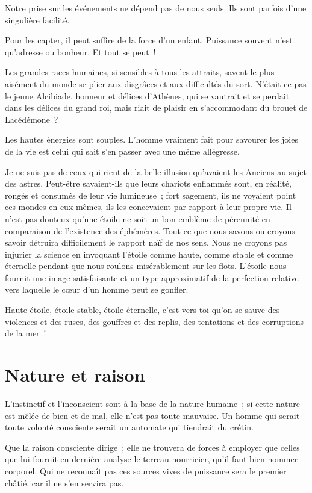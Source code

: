 \documentclass[french,twoside]{book} %
\newcommand{\astermono}{\medskip\centerline{\color{rubric}\large\selectfont{\syms ✻}}\medskip\par}%
\begin{document}
\astermono

\noindent Notre prise sur les événements ne dépend pas de nous seuls. Ils sont parfois d’une singulière facilité.\par
Pour les capter, il peut suffire de la force d’un enfant. Puissance souvent n’est qu’adresse ou bonheur. Et tout se peut !\par

\astermono

\noindent Les grandes races humaines, si sensibles à tous les attraits, savent le plus aisément du monde se plier aux disgrâces et aux difficultés du sort. N’était-ce pas le jeune Alcibiade, honneur et délices d’Athènes, qui se vautrait et se perdait dans les délices du grand roi, mais riait de plaisir en s’accommodant du brouet de Lacédémone ?\par
Les hautes énergies sont souples. L’homme vraiment fait pour savourer les joies de la vie est celui qui sait s’en passer avec une même allégresse.\par

\astermono

\noindent Je ne suis pas de ceux qui rient de la belle illusion qu’avaient les Anciens au sujet des astres. Peut-être savaient-ils que leurs chariots enflammés sont, en réalité, rongés et consumés de leur vie lumineuse ; fort sagement, ils ne voyaient point ces mondes en eux-mêmes, ils les concevaient par rapport à leur propre vie. Il n’est pas douteux qu’une étoile ne soit un bon emblème de pérennité en comparaison de l’existence des éphémères. Tout ce que nous savons ou croyons savoir détruira difficilement le rapport naïf de nos sens. Nous ne croyons pas injurier la science en invoquant l’étoile comme haute, comme stable et comme éternelle pendant que nous roulons misérablement sur les flots. L’étoile nous fournit une image satisfaisante et un type approximatif de la perfection relative vers laquelle le cœur d’un homme peut se gonfler.\par
Haute étoile, étoile stable, étoile éternelle, c’est vers toi qu’on se sauve des violences et des ruses, des gouffres et des replis, des tentations et des corruptions de la mer !
\section[{Nature et raison}]{Nature et raison}
\noindent L’instinctif et l’inconscient sont à la base de la nature humaine ; si cette nature est mêlée de bien et de mal, elle n’est pas toute mauvaise. Un homme qui serait toute volonté consciente serait un automate qui tiendrait du crétin.\par
Que la raison consciente dirige ; elle ne trouvera de forces à employer que celles que lui fournit en dernière analyse le terreau nourricier, qu’il faut bien nommer corporel. Qui ne reconnaît pas ces sources vives de puissance sera le premier châtié, car il ne s’en servira pas.\par
\end{document}
